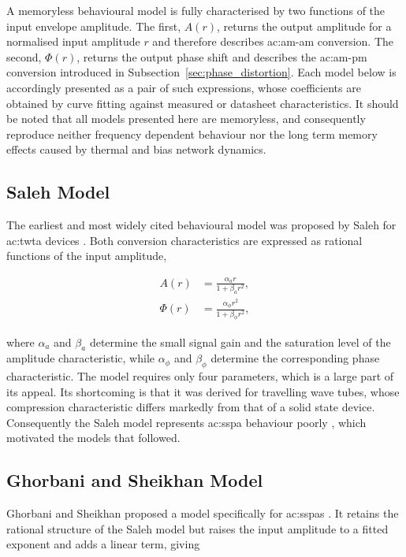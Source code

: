 A memoryless behavioural model is fully characterised by two functions of the input envelope amplitude. The first, $A(r)$, returns the output amplitude for a normalised input amplitude $r$ and therefore describes \gls{ac:am-am} conversion. The second, $\Phi(r)$, returns the output phase shift and describes the \gls{ac:am-pm} conversion introduced in Subsection~\ref{sec:phase_distortion}. Each model below is accordingly presented as a pair of such expressions, whose coefficients are obtained by curve fitting against measured or datasheet characteristics. It should be noted that all models presented here are memoryless, and consequently reproduce neither frequency dependent behaviour nor the long term memory effects caused by thermal and bias network dynamics.

\subsection{Saleh Model}\label{sec:saleh_model}

The earliest and most widely cited behavioural model was proposed by Saleh for \gls{ac:twta} devices \cite{saleh}. Both conversion characteristics are expressed as rational functions of the input amplitude,

\begin{align}
  A(r)    &= \frac{\alpha_a r}{1 + \beta_a r^2},        \label{eq:saleh_amam} \\
  \Phi(r) &= \frac{\alpha_\phi r^2}{1 + \beta_\phi r^2}, \label{eq:saleh_ampm}
\end{align}

where $\alpha_a$ and $\beta_a$ determine the small signal gain and the saturation level of the amplitude characteristic, while $\alpha_\phi$ and $\beta_\phi$ determine the corresponding phase characteristic. The model requires only four parameters, which is a large part of its appeal. Its shortcoming is that it was derived for travelling wave tubes, whose compression characteristic differs markedly from that of a solid state device. Consequently the Saleh model represents \gls{ac:sspa} behaviour poorly \cite{fisher}, which motivated the models that followed.

\subsection{Ghorbani and Sheikhan Model}\label{sec:ghorbani_model}

Ghorbani and Sheikhan proposed a model specifically for \glspl{ac:sspa} \cite{ghorbani}. It retains the rational structure of the Saleh model but raises the input amplitude to a fitted exponent and adds a linear term, giving

